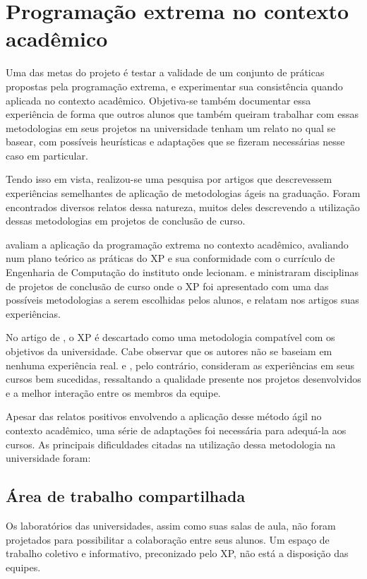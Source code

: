 \documentclass[a4paper,12pt,font=plain,header=plain]{abnt}
\begin{document}
	\section{Programação extrema no contexto acadêmico}
	Uma das metas do projeto é testar a validade de um conjunto de práticas propostas pela programação extrema, e experimentar sua consistência quando aplicada no contexto acadêmico. Objetiva-se também documentar essa experiência de forma que outros alunos que também queiram trabalhar com essas metodologias em seus projetos na universidade tenham um relato no qual se basear, com possíveis heurísticas e adaptações que se fizeram necessárias nesse caso em particular.

	Tendo isso em vista, realizou-se uma pesquisa por artigos que descrevessem experiências semelhantes de aplicação de metodologias ágeis na graduação. Foram encontrados diversos relatos dessa natureza, muitos deles descrevendo a utilização dessas metodologias em projetos de conclusão de curso.

	 avaliam a aplicação da programação extrema no contexto acadêmico, avaliando num plano teórico as práticas do XP e sua conformidade com o currículo de Engenharia de Computação do instituto onde lecionam.  e  ministraram disciplinas de projetos de conclusão de curso onde o XP foi apresentado com uma das possíveis metodologias a serem escolhidas pelos alunos, e relatam nos artigos suas experiências.

	No artigo de , o XP é descartado como uma metodologia compatível com os objetivos da universidade. Cabe observar que os autores não se baseiam em nenhuma experiência real.  e , pelo contrário, consideram as experiências em seus cursos bem sucedidas, ressaltando a qualidade presente nos projetos desenvolvidos e a melhor interação entre os membros da equipe.

	Apesar das relatos positivos envolvendo a aplicação desse método ágil no contexto acadêmico, uma série de adaptações foi necessária para adequá-la aos cursos. As principais dificuldades citadas na utilização dessa metodologia na universidade foram:

	\subsection{Área de trabalho compartilhada}
		Os laboratórios das universidades, assim como suas salas de aula, não foram projetados para possibilitar a colaboração entre seus alunos. Um espaço de trabalho coletivo e informativo, preconizado pelo XP, não está a disposição das equipes.
\end{document}
